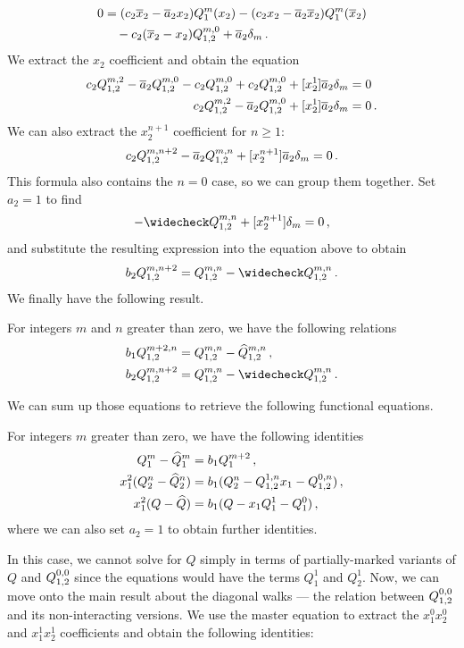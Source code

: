 \begin{align}
	\begin{split}
		0 &=(c_2\overline{x}_2- \overline{a}_2x_2)Q_1^m(x_2) -( c_2x_2- \overline{a}_2\overline{x}_2)Q_1^m(\overline{x}_2) \\
		&\quad- c_2(\overline{x}_2-x_2)Q_{1,2}^{m,0} + \overline{a}_2\delta_m \,.
	\end{split}
\end{align}
We extract the $x_2$ coefficient and obtain the equation
\begin{align}
	\begin{split}
		 c_2Q_{1,2}^{m,2}- \overline{a}_2Q_{1,2}^{m,0}-c_2Q_{1,2}^{m,0} + c_2Q_{1,2}^{m,0} + [x_2^1] \overline{a}_2\delta_m &= 0\\
		 c_2Q_{1,2}^{m,2}- \overline{a}_2Q_{1,2}^{m,0} + [x_2^1] \overline{a}_2\delta_m &= 0\,.
	\end{split}
\end{align}
We can also extract the $x_2^{n + 1}$ coefficient for $n\geq 1$:
\begin{align}
 	c_2 Q_{1,2}^{m,n + 2}- \overline{a}_2Q_{1,2}^{m,n} + [x_2^{n + 1}] \overline{a}_2\delta_m= 0\,.
\end{align}
This formula also contains the $n = 0$ case, so we can group them together. Set $a_2 = 1$ to find
\begin{align}
	-\wc Q_{1,2}^{m,n} + [x_2^{n + 1}]\delta_m = 0\,,
\end{align}
and substitute the resulting expression into the equation above to obtain
\begin{align}
	b_2 Q_{1,2}^{m,n + 2} = Q_{1,2}^{m,n} - \wc Q_{1,2}^{m,n}\,.
\end{align}
We finally have the following result.
\begin{cor} \label{cor:partialQsDiagonalSteps}For integers $m$ and $n$ greater than zero, we have the following relations
\begin{align}
	b_1 \Qf{m + 2,n} &= Q_{1,2}^{m,n}-\wh Q_{1,2}^{m,n}\,,\\
	b_2 \Qf{m,n + 2} &= Q_{1,2}^{m,n}-\wc Q_{1,2}^{m,n}\,.
\end{align}
\end{cor}

We can sum up those equations to retrieve the following functional equations.
\begin{cor} For integers $m$ greater than zero, we have the following identities
\begin{align}
	Q_1^m - \widehat Q_1^m &= b_1 Q_1^{m + 2}\,,\\
	x_1^2(Q_2^n-\widehat Q_2^n) &= b_1 (Q_2^n - Q_{1,2}^{1,n}x_1 - Q_{1,2}^{0,n})\,,\\
	x_1^2(Q-\widehat Q) &= b_1(Q-x_1Q_1^1-Q_1^0)\,,
\end{align}
where we can also set $a_2 = 1$ to obtain further identities.
\end{cor}
In this case, we cannot solve for $Q$ simply in terms of partially-marked variants of $Q$ and $Q_{1,2}^{0,0}$ since the equations would have the terms $Q_1^1$ and $Q_2^1$. Now, we can move onto the main result about the diagonal walks --- the relation between $Q_{1,2}^{0,0}$ and its non-interacting versions. We use the master equation to extract the $x_1^0x_2^0$ and $x_1^1x_2^1$ coefficients and obtain the following identities:

